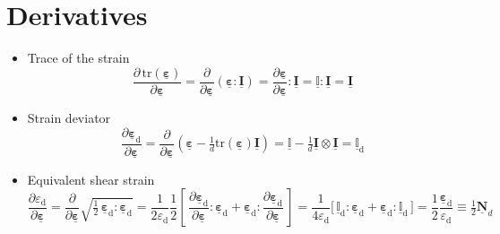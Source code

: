 \documentclass[fleqn]{goose-article}
\newcommand\T[1]{\underline{\bm{{#1}}}}
\newcommand\TT[1]{\underline{\mathbb{{#1}}}}
\begin{document}
\section{Derivatives}
\label{sec:nomenclature:derivatives}

\begin{itemize}

    \item Trace of the strain
    \begin{equation}
        \frac{ \partial \, \mathrm{tr} ( \T{\varepsilon} ) }{ \partial \T{\varepsilon} }
        =
        \frac{ \partial }{ \partial \T{\varepsilon} } \left( \T{\varepsilon} : \T{I} \right)
        =
        \frac{ \partial \T{\varepsilon} }{ \partial \T{\varepsilon} } : \T{I}
        =
        \TT{I} : \T{I}
        =
        \T{I}
    \end{equation}

    \item Strain deviator
    \begin{equation}
        \frac{\partial \T{\varepsilon}_\mathrm{d}}{\partial \T{\varepsilon}}
        =
        \frac{\partial}{\partial \T{\varepsilon}}
        \left( \T{\varepsilon} - \tfrac{1}{d} \mathrm{tr} ( \T{\varepsilon} ) \T{I} \right)
        =
        \TT{I} - \tfrac{1}{d} \T{I} \otimes \T{I}
        =
        \TT{I}_\mathrm{d}
    \end{equation}

    \item Equivalent shear strain
    \begin{equation}
        \frac{ \partial \varepsilon_\mathrm{d} }{ \partial \T{\varepsilon} }
        =
        \frac{\partial}{\partial \T{\varepsilon}}
        \sqrt{\tfrac{1}{2}\, \T{\varepsilon}_\mathrm{d} : \T{\varepsilon}_\mathrm{d}}
        =
        \frac{1}{2 \varepsilon_\mathrm{d}}
        \frac{1}{2}
        \left[\, \frac{\partial \T{\varepsilon}_\mathrm{d}}{\partial \T{\varepsilon}}
        : \T{\varepsilon}_\mathrm{d} + \T{\varepsilon}_\mathrm{d}
        : \frac{\partial \T{\varepsilon}_\mathrm{d}}{\partial \T{\varepsilon}} \,\right]
        =
        \frac{1}{4 \varepsilon_\mathrm{d}}
        \big[\, \TT{I}_\mathrm{d} : \T{\varepsilon}_\mathrm{d}
        + \T{\varepsilon}_\mathrm{d} : \TT{I}_\mathrm{d} \,\big]
        =
        \frac{1}{2}
        \frac{\T{\varepsilon}_\mathrm{d}}{\varepsilon_\mathrm{d}}
        \equiv
        \tfrac{1}{2}
        \T{N}_d
    \end{equation}

\end{itemize}
\end{document}
